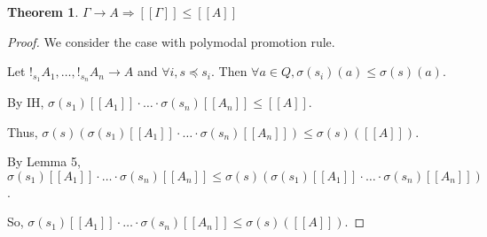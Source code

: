 \documentclass[a4paper]{article}
\newtheorem{theorem}{Theorem}
\begin{document}
\begin{theorem}
  $\Gamma \rightarrow A \Rightarrow [\![\Gamma]\!] \leq [\![A]\!]$
\end{theorem}

\begin{proof}
We consider the case with polymodal promotion rule.

Let $!_{s_1} A_1, \dots, !_{s_n} A_n \rightarrow A$ and $\forall i, s \preceq s_i$.
Then $\forall a \in Q, \sigma(s_i)(a) \leq \sigma(s)(a)$.

By IH, $\sigma(s_1)[\![A_1]\!] \cdot \dots \cdot \sigma(s_n) [\![A_n]\!] \leq [\![A]\!]$.

Thus, $\sigma(s)(\sigma(s_1)[\![A_1]\!] \cdot \dots \cdot \sigma(s_n) [\![A_n]\!]) \leq \sigma(s)([\![A]\!])$.

By Lemma 5, $\sigma(s_1)[\![A_1]\!] \cdot \dots \cdot \sigma(s_n) [\![A_n]\!] \leq \sigma(s)(\sigma(s_1)[\![A_1]\!] \cdot \dots \cdot \sigma(s_n) [\![A_n]\!])$.

So, $\sigma(s_1)[\![A_1]\!] \cdot \dots \cdot \sigma(s_n) [\![A_n]\!] \leq \sigma(s)([\![A]\!])$.
\end{proof}
\end{document}
